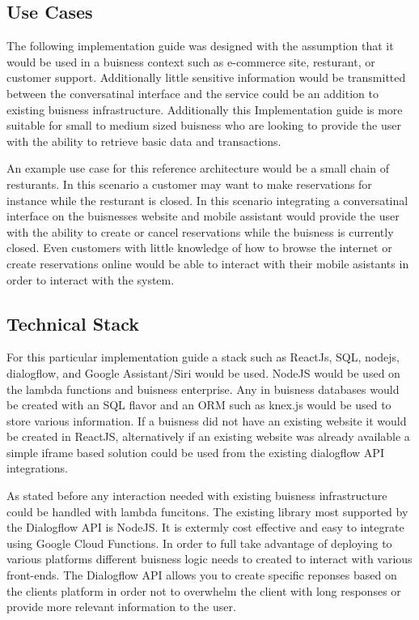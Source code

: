 \documentclass[9pt,software]{livecoms}
\begin{document}
\subsection{Use Cases}
The following implementation guide was designed with the assumption that it would be used in a buisness context such as 
e-commerce site, resturant, or customer support. Additionally little sensitive information would be transmitted between the 
conversatinal interface and the service could be an addition to existing buisness infrastructure. Additionally this 
Implementation guide is more suitable for small to medium sized buisness who are looking to provide the user with 
the ability to retrieve basic data and transactions.

An example use case for this reference architecture would be a small chain of resturants. In this scenario a customer may
want to make reservations for instance while the resturant is closed. In this scenario integrating a conversatinal interface 
on the buisnesses website and mobile assistant would provide the user with the ability to create or cancel reservations while 
the buisness is currently closed. Even customers with little knowledge of how to browse the internet or create reservations online
would be able to interact with their mobile asistants in order to interact with the system.  

\subsection{Technical Stack}
For this particular implementation guide a stack such as ReactJs, SQL, nodejs, dialogflow, and Google Assistant/Siri would be used. NodeJS would
be used on the lambda functions and buisness enterprise. Any in buisness databases would be created with an SQL flavor and an ORM such as 
knex.js would be used to store various information. If a buisness did not have an existing website it would be created in ReactJS, alternatively 
if an existing website was already available a simple iframe based solution could be used from the existing dialogflow API integrations.

As stated before any interaction needed with existing buisness infrastructure could be handled with lambda funcitons. The existing library most 
supported by the Dialogflow API is NodeJS. It is extermly cost effective and easy to integrate using Google Cloud Functions. In order to full take
advantage of deploying to various platforms different buisness logic needs to created to interact with various front-ends. The Dialogflow API allows
you to create specific reponses based on the clients platform in order not to overwhelm the client with long responses or provide more relevant information
to the user.  
\end{document}
